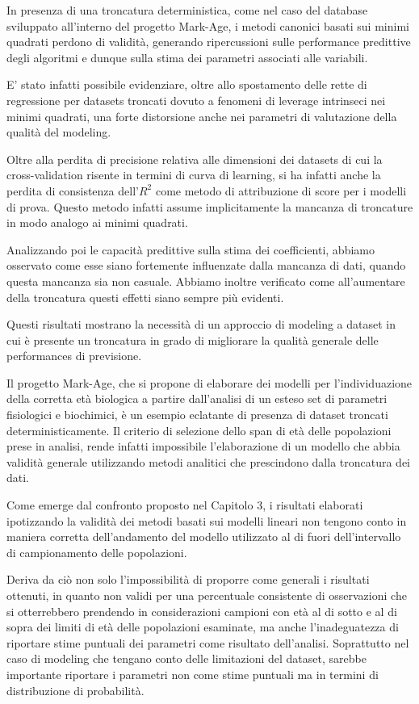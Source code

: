 \documentclass[12pt,openright,twoside,a4paper]{book}
\begin{document}
In presenza di una troncatura deterministica, come nel caso del database sviluppato all'interno del progetto Mark-Age, i metodi canonici basati sui minimi quadrati perdono di validità, generando ripercussioni sulle performance predittive degli algoritmi e dunque sulla stima dei parametri associati alle variabili.

E' stato infatti possibile evidenziare, oltre allo spostamento delle rette di regressione per datasets troncati dovuto a fenomeni di leverage intrinseci nei minimi quadrati, una forte distorsione anche nei parametri di valutazione della qualità del modeling.

Oltre alla perdita di precisione relativa alle dimensioni dei datasets di cui la cross-validation risente in termini di curva di learning, si ha infatti anche la perdita di consistenza dell'$R^2$ come metodo di attribuzione di score per i modelli di prova. 
Questo metodo infatti assume implicitamente la mancanza di troncature in modo analogo ai minimi quadrati.

Analizzando poi le capacità predittive sulla stima dei coefficienti, abbiamo osservato come esse siano fortemente influenzate dalla mancanza di dati, quando questa mancanza sia non casuale.
Abbiamo inoltre verificato come all'aumentare della troncatura questi effetti siano sempre più evidenti.

Questi risultati mostrano la necessità di un approccio di modeling a dataset in cui è presente un troncatura in grado di migliorare la qualità generale delle performances di previsione.

Il progetto Mark-Age, che si propone di elaborare dei modelli per l'individuazione della corretta età biologica a partire dall'analisi di un esteso set di parametri fisiologici e biochimici, è un esempio eclatante di presenza di dataset troncati deterministicamente.
Il criterio di selezione dello span di età delle popolazioni prese in analisi, rende infatti impossibile l'elaborazione di un modello che abbia validità generale utilizzando metodi analitici che prescindono dalla troncatura dei dati.

Come emerge dal confronto proposto nel Capitolo 3, i risultati elaborati ipotizzando la validità dei metodi basati sui modelli lineari non tengono conto in maniera corretta dell'andamento del modello utilizzato al di fuori dell'intervallo di campionamento delle popolazioni.

Deriva da ciò non solo l'impossibilità di proporre come generali i risultati ottenuti, in quanto non validi per una percentuale consistente di osservazioni che si otterrebbero prendendo in considerazioni campioni con età al di sotto e al di sopra dei limiti di età delle popolazioni esaminate, ma anche l'inadeguatezza di riportare stime puntuali dei parametri come risultato dell'analisi. 
Soprattutto nel caso di modeling che tengano conto delle limitazioni del dataset, sarebbe importante riportare i parametri non come stime puntuali ma in termini di distribuzione di probabilità.
\end{document}
